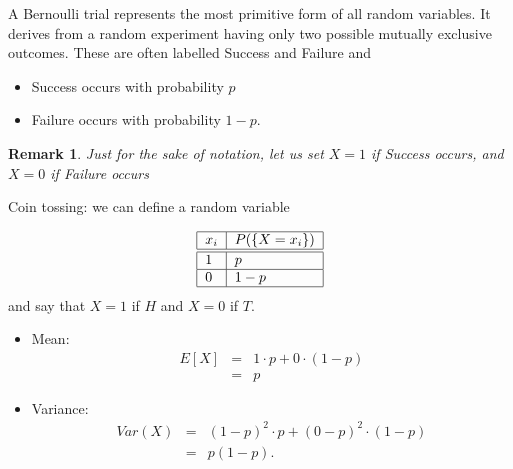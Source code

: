 \documentclass[smaller, handout]{beamer}\usepackage[]{graphicx}\usepackage[]{color}
\newtheorem{remark}{Remark}[section]
\newenvironment{stepitemize}{\begin{itemize}[<+->]}{\end{itemize} }
\begin{document}
\begin{frame}{\secname}%

A Bernoulli trial represents the most primitive form of all random variables. It derives from a random experiment having only two possible mutually exclusive outcomes. These are often labelled Success and Failure and


\begin{stepitemize}
\item Success occurs with probability $p$
\item Failure occurs with probability $1-p$.
\end{stepitemize}


\begin{remark}
Just for the sake of notation, let us set $X=1$ if \emph{Success} occurs, and $X=0$ if \emph{Failure} occurs
\end{remark}


\begin{example}
Coin tossing:  we can define a random variable

\begin{equation*}
\begin{tabular}{|l|l|}
\hline
$x_i$ & $P(\left\{ X=x_i\right\}) $ \\ \hline\hline
$1$ & $p$ \\ \hline
$0$ & $1-p$ \\ \hline
\end{tabular}%
\end{equation*}
and say that $X=1$ if $H$ and $X=0$ if $T$.

\end{example}

\end{frame}

\begin{frame}{\secname}%


\begin{stepitemize}
\item Mean:
\begin{eqnarray*}
E\left[ X\right] &=&1 \cdot p+0 \cdot (1-p) \\
&=&p
\end{eqnarray*}

\item Variance:%
\begin{eqnarray*}
Var\left( X\right) &=&\left( 1-p\right) ^{2} \cdot p+\left( 0-p\right)
^{2} \cdot \left( 1-p\right) \\
&=&p\left( 1-p\right).
\end{eqnarray*}
\end{stepitemize}




\end{frame}%
\end{document}
